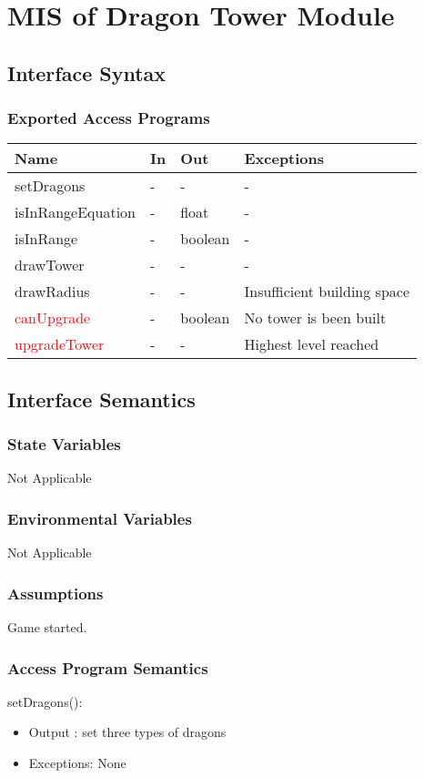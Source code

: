 \documentclass[12,english]{article}
\begin{document}
\section{MIS of Dragon Tower Module}
\subsection{Interface Syntax}
\subsubsection{Exported Access Programs}
\begin{table}[h!]
    \centering
    \begin{tabular}{|p{4cm}|p{2cm}|p{2cm}|p{2cm}|}
    \hline
    \textbf {Name}  & {In} & {Out} & {Exceptions} \\
    \hline
    setDragons & - & - & -\\
    \hline
    isInRangeEquation & - & float & -\\
    \hline
    isInRange & - & boolean & -\\
    \hline
    drawTower & - & - & -\\
    \hline
    drawRadius & - & - & Insufficient building space\\
    \hline
    \textcolor{red}{canUpgrade} & - & boolean & No tower is been built\\
    \hline
    \textcolor{red}{upgradeTower} & - & - & Highest level reached\\
    \hline
    \end{tabular}
\end{table}
\newpage

\subsection{Interface Semantics}
\subsubsection{State Variables}
Not Applicable
\subsubsection{Environmental Variables}
Not Applicable
\subsubsection{Assumptions}
Game started. 
\subsubsection{Access Program Semantics}
\noindent setDragons():
\begin{itemize}
    \item Output : set three types of dragons
    \item Exceptions: None
\end{itemize}
\end{document}
